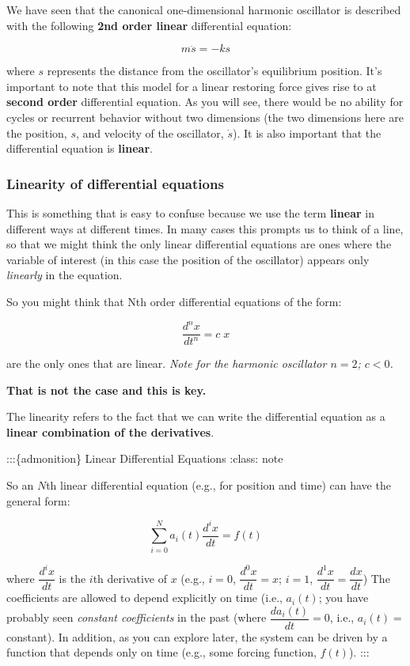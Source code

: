 We have seen that the canonical one-dimensional harmonic oscillator is
described with the following \textbf{2nd order linear} differential
equation:

\[m\ddot{s} = -k{s}\]

where \(s\) represents the distance from the oscillator's equilibrium
position. It's important to note that this model for a linear restoring
force gives rise to at \textbf{second order} differential equation. As
you will see, there would be no ability for cycles or recurrent behavior
without two dimensions (the two dimensions here are the position, \(s\),
and velocity of the oscillator, \(\dot{s}\)). It is also important that
the differential equation is \textbf{linear}.

\subsubsection{Linearity of differential
equations}\label{linearity-of-differential-equations}

This is something that is easy to confuse because we use the term
\textbf{linear} in different ways at different times. In many cases this
prompts us to think of a line, so that we might think the only linear
differential equations are ones where the variable of interest (in this
case the position of the oscillator) appears only \emph{linearly} in the
equation.

So you might think that Nth order differential equations of the form:

\[\dfrac{d^n x}{dt^n} = c\;x\]

are the only ones that are linear. \emph{Note for the harmonic
oscillator \(n=2\); \(c<0\).}

\textbf{That is not the case and this is key.}

The linearity refers to the fact that we can write the differential
equation as a \textbf{linear combination of the derivatives}.

:::\{admonition\} Linear Differential Equations :class: note

So an \(N\)th linear differential equation (e.g., for position and time)
can have the general form:

\[\sum_{i=0}^N a_i(t)\dfrac{d^ix}{dt} = f(t)\]

where \(\dfrac{d^ix}{dt}\) is the \(i\)th derivative of \(x\) (e.g.,
\(i=0\), \(\dfrac{d^0x}{dt}=x\); \(i=1\),
\(\dfrac{d^1x}{dt}=\dfrac{dx}{dt}\)) The coefficients are allowed to
depend explicitly on time (i.e., \(a_i(t)\); you have probably seen
\emph{constant coefficients} in the past (where
\(\dfrac{da_i(t)}{dt}=0\), i.e., \(a_i(t) =\) constant). In addition, as
you can explore later, the system can be driven by a function that
depends only on time (e.g., some forcing function, \(f(t)\)). :::

